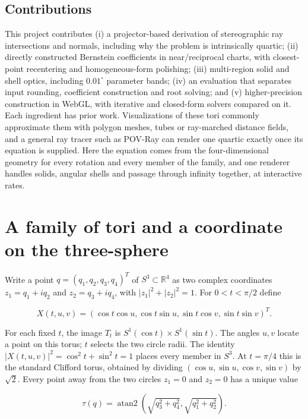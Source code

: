 \documentclass[11pt,a4paper]{article}
\begin{document}
\subsection*{Contributions}\label{contributions}

This project contributes (i) a projector-based derivation of
stereographic ray intersections and normals, including why the problem
is intrinsically quartic; (ii) directly constructed Bernstein
coefficients in near/reciprocal charts, with closest-point recentering
and homogeneous-form polishing; (iii) multi-region solid and shell
optics, including \(0.01^\circ\) parameter bands; (iv) an evaluation
that separates input rounding, coefficient construction and root
solving; and (v) higher-precision construction in WebGL, with iterative
and closed-form solvers compared on it. Each ingredient has prior work.
Visualizations of these tori commonly approximate them with polygon
meshes, tubes or ray-marched distance fields, and a general ray tracer
such as POV-Ray can render one quartic exactly once its equation is
supplied. Here the equation comes from the four-dimensional geometry for
every rotation and every member of the family, and one renderer handles
solids, angular shells and passage through infinity together, at
interactive rates.

\section{A family of tori and a coordinate on the
three-sphere}\label{a-family-of-tori-and-a-coordinate-on-the-three-sphere}

Write a point \(q=(q_1,q_2,q_3,q_4)^T\) of \(S^3\subset\mathbb R^4\) as
two complex coordinates \(z_1=q_1+iq_2\) and \(z_2=q_3+iq_4\), with
\(|z_1|^2+|z_2|^2=1\). For \(0<t<\pi/2\) define

\[
X(t,u,v)=(\cos t\cos u,\cos t\sin u,\sin t\cos v,\sin t\sin v)^T.
\]

For each fixed \(t\), the image \(T_t\) is
\(S^1(\cos t)\times S^1(\sin t)\). The angles \(u,v\) locate a point on
this torus; \(t\) selects the two circle radii. The identity
\(|X(t,u,v)|^2=\cos^2t+\sin^2t=1\) places every member in \(S^3\). At
\(t=\pi/4\) this is the standard Clifford torus, obtained by dividing
\((\cos u,\sin u,\cos v,\sin v)\) by \(\sqrt{2}\). Every point away from
the two circles \(z_1=0\) and \(z_2=0\) has a unique value

\[
\tau(q)=\operatorname{atan2}\!\left(\sqrt{q_3^2+q_4^2},\sqrt{q_1^2+q_2^2}\right).
\]
\end{document}
